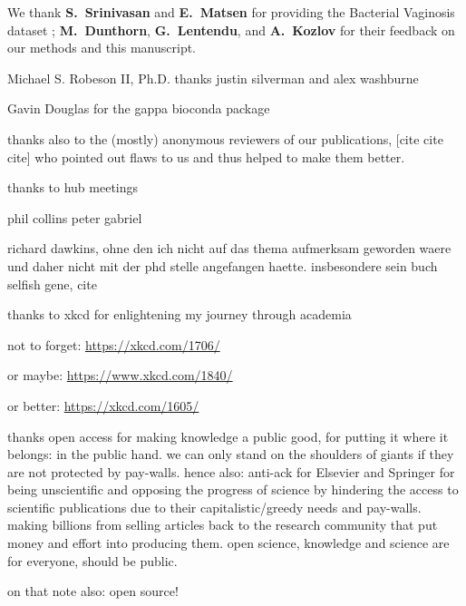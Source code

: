 We thank \textbf{S.~Srinivasan} and \textbf{E.~Matsen}
for providing the Bacterial Vaginosis dataset \cite{Srinivasan2012};
\textbf{M.~Dunthorn}, \textbf{G.~Lentendu}, %
and \textbf{A.~Kozlov}
for their feedback on our methods and this manuscript.


Michael S. Robeson II, Ph.D.
thanks justin silverman and alex washburne

Gavin Douglas for the gappa bioconda package

thanks also to the (mostly) anonymous reviewers of our publications, [cite cite cite]
who pointed out flaws to us and thus helped to make them better.

thanks to hub meetings

phil collins peter gabriel

richard dawkins, ohne den ich nicht auf das thema aufmerksam geworden waere und daher nicht mit der phd stelle angefangen haette.
insbesondere sein buch selfish gene, cite


\todo{} \cite{Beer2018}

thanks to xkcd for enlightening my journey through academia

not to forget:
\url{https://xkcd.com/1706/}

or maybe:
\url{https://www.xkcd.com/1840/}

or better:
\url{https://xkcd.com/1605/}

thanks open access for making knowledge a public good, for putting it where it belongs: in the public hand.
we can only stand on the shoulders of giants if they are not protected by pay-walls.
hence also:
anti-ack for Elsevier and Springer for being unscientific and opposing the progress of science
by hindering the access to scientific publications due to their capitalistic/greedy needs and pay-walls.
making billions from selling articles back to the research community that put money and effort into producing them.
open science, knowledge and science are for everyone, should be public.

on that note also: open source!

